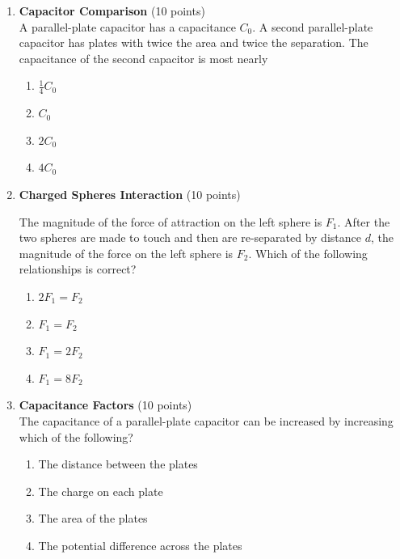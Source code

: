 \begin{enumerate}
  \item \textbf{Capacitor Comparison} (10 points)\\
  A parallel-plate capacitor has a capacitance $C_0$. A second parallel-plate capacitor has plates with twice the area and twice the separation. The capacitance of the second capacitor is most nearly
  \begin{enumerate}[label=(\Alph*)]
    \item $\frac{1}{4}C_0$
    \item $C_0$
    \item $2C_0$
    \item $4C_0$
  \end{enumerate}
  \begin{subanswer}
  \end{subanswer}

  \item \textbf{Charged Spheres Interaction} (10 points)\\
  
  The magnitude of the force of attraction on the left sphere is $F_1$. After the two spheres are made to touch and then are re-separated by distance $d$, the magnitude of the force on the left sphere is $F_2$. Which of the following relationships is correct?
  \begin{enumerate}[label=(\Alph*)]
    \item $2F_1 = F_2$
    \item $F_1 = F_2$
    \item $F_1 = 2F_2$
    \item $F_1 = 8F_2$
  \end{enumerate}
  \begin{subanswer}
  \end{subanswer}

  \item \textbf{Capacitance Factors} (10 points)\\
  The capacitance of a parallel-plate capacitor can be increased by increasing which of the following?
  \begin{enumerate}[label=(\Alph*)]
    \item The distance between the plates
    \item The charge on each plate
    \item The area of the plates
    \item The potential difference across the plates
  \end{enumerate}
  \begin{subanswer}
  \end{subanswer}


\end{enumerate}
